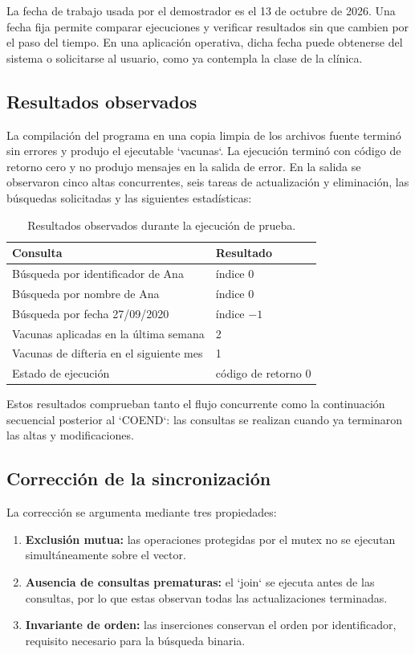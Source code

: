 \documentclass[12pt,letterpaper]{article}
\begin{document}
La fecha de trabajo usada por el demostrador es el 13 de octubre de 2026. Una
fecha fija permite comparar ejecuciones y verificar resultados sin que cambien
por el paso del tiempo. En una aplicación operativa, dicha fecha puede
obtenerse del sistema o solicitarse al usuario, como ya contempla la clase de
la clínica.

\subsection{Resultados observados}

La compilación del programa en una copia limpia de los archivos fuente terminó
sin errores y produjo el ejecutable `vacunas`. La ejecución terminó con código
de retorno cero y no produjo mensajes en la salida de error. En la salida se
observaron cinco altas concurrentes, seis tareas de actualización y eliminación,
las búsquedas solicitadas y las siguientes estadísticas:

\begin{table}[H]
\centering
\caption{Resultados observados durante la ejecución de prueba.}
\label{tab:resultados}
\begin{tabularx}{0.78\textwidth}{p{7.0cm}Y}
\toprule
\textbf{Consulta} & \textbf{Resultado} \\
\midrule
Búsqueda por identificador de Ana & índice 0 \\
Búsqueda por nombre de Ana & índice 0 \\
Búsqueda por fecha 27/09/2020 & índice $-1$ \\
Vacunas aplicadas en la última semana & 2 \\
Vacunas de difteria en el siguiente mes & 1 \\
Estado de ejecución & código de retorno 0 \\
\bottomrule
\end{tabularx}
\end{table}

Estos resultados comprueban tanto el flujo concurrente como la continuación
secuencial posterior al `COEND`: las consultas se realizan cuando ya terminaron
las altas y modificaciones.

\subsection{Corrección de la sincronización}

La corrección se argumenta mediante tres propiedades:

\begin{enumerate}[leftmargin=1.2cm]
    \item \textbf{Exclusión mutua:} las operaciones protegidas por el mutex no
    se ejecutan simultáneamente sobre el vector.
    \item \textbf{Ausencia de consultas prematuras:} el `join` se ejecuta antes
    de las consultas, por lo que estas observan todas las actualizaciones
    terminadas.
    \item \textbf{Invariante de orden:} las inserciones conservan el orden por
    identificador, requisito necesario para la búsqueda binaria.
\end{enumerate}
\end{document}
